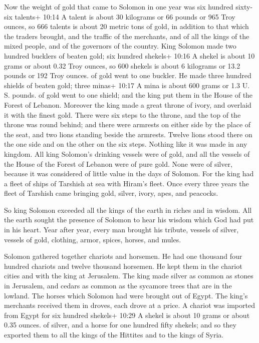  Now the weight of gold that came to Solomon in one year
was six hundred sixty-six talents+ 10:14 A talent is about 30 kilograms
or 66 pounds or 965 Troy ounces, so 666 talents is about 20 metric tons
of gold,  in addition to that which the traders brought,
and the traffic of the merchants, and of all the kings of the mixed
people, and of the governors of the country.  King Solomon
made two hundred bucklers of beaten gold; six hundred shekels+ 10:16 A
shekel is about 10 grams or about 0.32 Troy ounces, so 600 shekels is
about 6 kilograms or 13.2 pounds or 192 Troy ounces. of gold went to one
buckler.  He made three hundred shields of beaten gold;
three minas+ 10:17 A mina is about 600 grams or 1.3 U. S. pounds. of
gold went to one shield; and the king put them in the House of the
Forest of Lebanon.  Moreover the king made a great throne
of ivory, and overlaid it with the finest gold.  There were
six steps to the throne, and the top of the throne was round behind; and
there were armrests on either side by the place of the seat, and two
lions standing beside the armrests.  Twelve lions stood
there on the one side and on the other on the six steps. Nothing like it
was made in any kingdom.  All king Solomon's drinking
vessels were of gold, and all the vessels of the House of the Forest of
Lebanon were of pure gold. None were of silver, because it was
considered of little value in the days of Solomon.  For the
king had a fleet of ships of Tarshish at sea with Hiram's fleet. Once
every three years the fleet of Tarshish came bringing gold, silver,
ivory, apes, and peacocks.

 So king Solomon exceeded all the kings of the earth in
riches and in wisdom.  All the earth sought the presence of
Solomon to hear his wisdom which God had put in his heart. 
Year after year, every man brought his tribute, vessels of silver,
vessels of gold, clothing, armor, spices, horses, and mules.

 Solomon gathered together chariots and horsemen. He had
one thousand four hundred chariots and twelve thousand horsemen. He kept
them in the chariot cities and with the king at Jerusalem. 
The king made silver as common as stones in Jerusalem, and cedars as
common as the sycamore trees that are in the lowland.  The
horses which Solomon had were brought out of Egypt. The king's merchants
received them in droves, each drove at a price.  A chariot
was imported from Egypt for six hundred shekels+ 10:29 A shekel is about
10 grams or about 0.35 ounces. of silver, and a horse for one hundred
fifty shekels; and so they exported them to all the kings of the
Hittites and to the kings of Syria.

